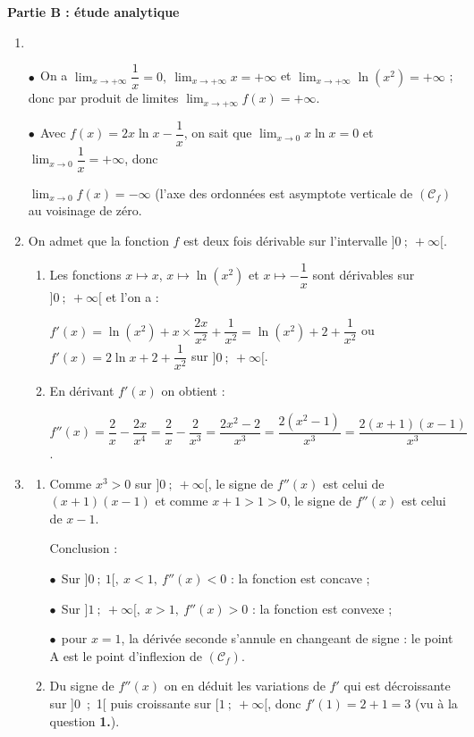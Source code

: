 \textbf{Partie B : étude analytique}

\medskip

\begin{enumerate}
\item ~

$\bullet~~$On a $\displaystyle\lim_{x \to + \infty} \dfrac 1x = 0, \: \displaystyle\lim_{x \to + \infty} x = + \infty$ et $\displaystyle\lim_{x \to + \infty} \ln \left(x^2\right) = + \infty$ ; donc par produit de limites $\displaystyle\lim_{x \to + \infty} f(x) = + \infty$.

$\bullet~~$Avec $f(x) = 2x \ln x - \dfrac1x$, on sait que $\displaystyle\lim_{x \to 0} x \ln x = 0$ et $\displaystyle\lim_{x \to 0}\dfrac 1x = + \infty$, donc 

$\displaystyle\lim_{x \to 0}f(x) = - \infty$ (l'axe des ordonnées est asymptote verticale de $(\mathcal{C}_f)$ au voisinage de zéro.
\item On admet que la fonction $f$ est deux fois dérivable sur l'intervalle $]0~;~+\infty[$.
	\begin{enumerate}
		\item 
Les fonctions $x \longmapsto x$, \: $x \longmapsto \ln \left(x^2 \right)$ et $x \longmapsto - \dfrac 1x$ sont dérivables sur $]0~;~+ \infty[$ et l'on a :

$f'(x) = \ln \left(x^2 \right) + x \times \dfrac{2x}{x^2} + \dfrac{1}{x^2} = \ln \left(x^2 \right)+  2 +  \dfrac{1}{x^2}$ ou $f'(x) = 2\ln x + 2 + \dfrac{1}{x^2}$ sur $]0~;~+ \infty[$.
		\item 


En dérivant $f'(x)$ on obtient :

$f''(x) = \dfrac2x - \dfrac{2x}{x^4} = \dfrac2x - \dfrac{2}{x^3} = \dfrac{2x^2 - 2}{x^3} = \dfrac{2\left(x^2 - 1\right)}{x^3} = \dfrac{2(x + 1)(x - 1)}{x^3}$.
	\end{enumerate}
\item 
	\begin{enumerate}
		\item 
		Comme $x^3 > 0$ sur $]0~;~+ \infty[$, le signe de $f''(x)$ est celui de $(x + 1)(x - 1)$ et comme $x + 1 > 1 > 0$, le signe de $f''(x)$ est celui de $x - 1$.

Conclusion :

$\bullet~~$Sur $]0~;~1[,\: x < 1, \: f''(x) < 0$ : la fonction est concave ;

$\bullet~~$Sur $]1~;~+\infty[,\: x > 1, \: f''(x) > 0$ : la fonction est convexe ;

$\bullet~~$pour $x = 1$, la dérivée seconde s'annule en changeant de signe : le point A est le point d'inflexion de $(\mathcal{C}_f)$.
		\item 
Du signe de $f''(x)$ on en déduit les variations de $f'$ qui est décroissante sur ]0~;~1[ puis croissante sur $[1~;~+ \infty[$, donc $f'(1) = 2 + 1 = 3$ (vu à la question \textbf{1.}).


\end{enumerate}
\end{enumerate}
